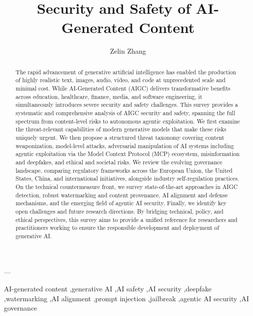 ––\documentclass[preprint,12pt]{elsarticle}
\begin{document}
\begin{frontmatter}

\title{Security and Safety of AI-Generated Content}

\author{Zelin Zhang}


\begin{abstract}
The rapid advancement of generative artificial intelligence has enabled the production of highly realistic text, images, audio, video, and code at unprecedented scale and minimal cost. While AI-Generated Content (AIGC) delivers transformative benefits across education, healthcare, finance, media, and software engineering, it simultaneously introduces severe security and safety challenges. This survey provides a systematic and comprehensive analysis of AIGC security and safety, spanning the full spectrum from content-level risks to autonomous agentic exploitation. We first examine the threat-relevant capabilities of modern generative models that make these risks uniquely urgent. We then propose a structured threat taxonomy covering content weaponization, model-level attacks, adversarial manipulation of AI systems including agentic exploitation via the Model Context Protocol (MCP) ecosystem, misinformation and deepfakes, and ethical and societal risks. We review the evolving governance landscape, comparing regulatory frameworks across the European Union, the United States, China, and international initiatives, alongside industry self-regulation practices. On the technical countermeasure front, we survey state-of-the-art approaches in AIGC detection, robust watermarking and content provenance, AI alignment and defense mechanisms, and the emerging field of agentic AI security. Finally, we identify key open challenges and future research directions. By bridging technical, policy, and ethical perspectives, this survey aims to provide a unified reference for researchers and practitioners working to ensure the responsible development and deployment of generative AI.
\end{abstract}

\begin{keyword}
AI-generated content \sep generative AI \sep AI safety \sep AI security \sep deepfake \sep watermarking \sep AI alignment \sep prompt injection \sep jailbreak \sep agentic AI security \sep AI governance
\end{keyword}

\end{frontmatter}
\end{document}
